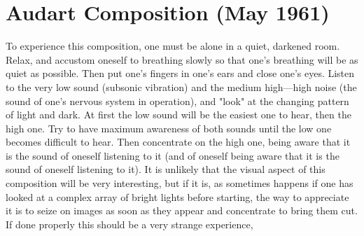 \clearpage
\section{Audart Composition (May 1961)}

To experience this composition, one must be alone in a
quiet, darkened room. Relax, and accustom oneself to breathing
slowly so that one's breathing will be as quiet as possible.
Then put one's fingers in one's ears and close one's eyes.
Listen to the very low sound (subsonic vibration) and the medium
high---high noise (the sound of one's nervous system in operation),
and "look" at the changing pattern of light and dark.
At first the low sound will be the easiest one to hear, then
the high one. Try to have maximum awareness of both sounds
until the low one becomes difficult to hear. Then concentrate
on the high one, being aware that it is the sound of oneself
listening to it (and of oneself being aware that it is the 
sound of oneself listening to it). It is unlikely that the
visual aspect of this composition will be very interesting,
but if it is, as sometimes happens if one has looked at a complex
array of bright lights before starting, the way to appreciate 
it is to seize on images as soon as they appear and concentrate
to bring them cut. If done properly this should be a very strange experience, 

\clearpage
